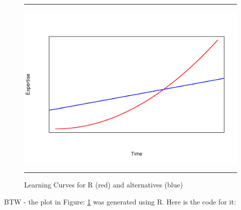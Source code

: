 \documentclass[11pt, letterpaper, twoside]{memoir}\usepackage{knitr}
\begin{document}
\begin{figure}
\centering
\rule{4in}{1pt}
\begin{knitrout}
\color{fgcolor}
\includegraphics[width=\maxwidth]{figure/unnamed-chunk-6-1} 

\end{knitrout}
\caption{Learning Curves for R (red) and alternatives (blue)}
\label{fig:lcurve}
\rule{4in}{1pt}
\end{figure}

BTW - the plot in Figure: \ref{fig:lcurve} was generated using R. Here is the code for it:
\begin{knitrout}
\color{fgcolor}\begin{kframe}
\begin{alltt}
\hlopt{^}\hlstd{,} \hlstd{=} \hlstd{,} \hlstd{=} \hlstd{,}  \hlstd{=} \hlstd{,} \hlstd{=}\hlstd{,}
       \hlstd{=} \hlstd{,} \hlstd{=}\hlstd{,}  \hlstd{=} \hlstd{,}  \hlstd{=} \hlstd{)}
\hlstd{(} \hlstd{=} \hlstd{,} \hlstd{=} \hlstd{,}  \hlstd{=} \hlstd{,}  \hlstd{=} \hlstd{)}
\end{alltt}
\end{kframe}
\end{knitrout}
\end{document}
